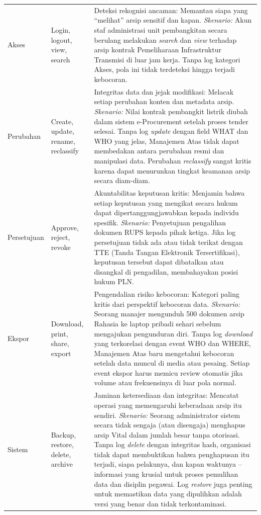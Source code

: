 \documentclass[12pt,a4paper]{report}
\begin{document}
\begin{longtable}{@{}>{\raggedright\arraybackslash}p{2.2cm} >{\raggedright\arraybackslash}p{2.8cm} p{8.7cm}@{}}
Akses & Login, logout, view, search & Deteksi rekognisi ancaman: Memantau siapa yang ``melihat'' arsip sensitif dan kapan. \textit{Skenario:} Akun staf administrasi unit pembangkitan secara berulang melakukan \textit{search} dan \textit{view} terhadap arsip kontrak Pemeliharaan Infrastruktur Transmisi di luar jam kerja. Tanpa log kategori Akses, pola ini tidak terdeteksi hingga terjadi kebocoran. \\
\addlinespace
Perubahan & Create, update, rename, reclassify & Integritas data dan jejak modifikasi: Melacak setiap perubahan konten dan metadata arsip. \textit{Skenario:} Nilai kontrak pembangkit listrik diubah dalam sistem e-Procurement setelah proses tender selesai. Tanpa log \textit{update} dengan field WHAT dan WHO yang jelas, Manajemen Atas tidak dapat membedakan antara perubahan resmi dan manipulasi data. Perubahan \textit{reclassify} sangat kritis karena dapat menurunkan tingkat keamanan arsip secara diam-diam. \\
\addlinespace
Persetujuan & Approve, reject, revoke & Akuntabilitas keputusan kritis: Menjamin bahwa setiap keputusan yang mengikat secara hukum dapat dipertanggungjawabkan kepada individu spesifik. \textit{Skenario:} Penyetujuan pengalihan dokumen RUPS kepada pihak ketiga. Jika log persetujuan tidak ada atau tidak terikat dengan TTE (Tanda Tangan Elektronik Tersertifikasi), keputusan tersebut dapat dibatalkan atau disangkal di pengadilan, membahayakan posisi hukum PLN. \\
\addlinespace
Ekspor & Download, print, share, export & Pengendalian risiko kebocoran: Kategori paling kritis dari perspektif kebocoran data. \textit{Skenario:} Seorang manajer mengunduh 500 dokumen arsip Rahasia ke laptop pribadi sehari sebelum mengajukan pengunduran diri. Tanpa log \textit{download} yang terkorelasi dengan event WHO dan WHERE, Manajemen Atas baru mengetahui kebocoran setelah data muncul di media atau pesaing. Setiap event ekspor harus memicu review otomatis jika volume atau frekuensinya di luar pola normal. \\
\addlinespace
Sistem & Backup, restore, delete, archive & Jaminan ketersediaan dan integritas: Mencatat operasi yang memengaruhi keberadaan arsip itu sendiri. \textit{Skenario:} Seorang administrator sistem secara tidak sengaja (atau disengaja) menghapus arsip Vital dalam jumlah besar tanpa otorisasi. Tanpa log \textit{delete} dengan integritas hash, organisasi tidak dapat membuktikan bahwa penghapusan itu terjadi, siapa pelakunya, dan kapan waktunya -- informasi yang krusial untuk proses pemulihan data dan disiplin pegawai. Log \textit{restore} juga penting untuk memastikan data yang dipulihkan adalah versi yang benar dan tidak terkontaminasi. \\
\end{longtable}
\endgroup
\end{document}
